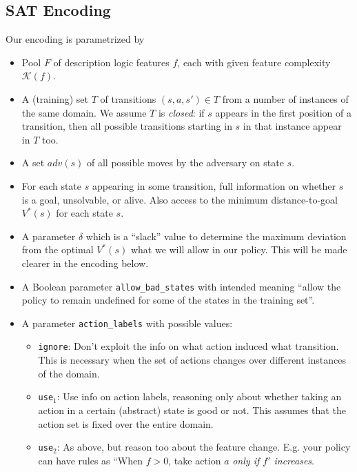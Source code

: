 \documentclass[a4paper]{article}
\begin{document}
\subsection{SAT Encoding}

Our encoding is parametrized by
\begin{itemize}
 \item Pool $F$ of description logic features $f$, each with given feature complexity $\mathcal{K}(f)$.
 \item A (training) set $T$ of transitions $(s, a, s') \in T$ from a number of instances of the same domain.
       We assume $T$ is \emph{closed}: if $s$ appears in the first position of a transition, then all possible
       transitions starting in $s$ in that instance appear in $T$ too.
 \item A set $adv(s)$ of all possible moves by the adversary on state $s$.

 \item For each state $s$ appearing in some transition, full information on whether $s$
       is a goal, unsolvable, or alive.
       Also access to the minimum distance-to-goal $V^*(s)$ for each state $s$.
 \item A parameter $\delta$ which is a ``slack'' value to determine the maximum deviation from the optimal $V^*(s)$
 what we will allow in our policy. This will be made clearer in the encoding below.

 \item A Boolean parameter \texttt{allow\_bad\_states} with intended meaning ``allow the policy
        to remain undefined for some of the states in the training set''.
 \item A parameter \texttt{action\_labels} with possible values:
 \begin{itemize}
   \item \texttt{ignore}: Don't exploit the info on what action induced what transition. This is necessary
  when the set of actions changes over different instances of the domain.
   \item \texttt{use$_1$}: Use info on action labels, reasoning only about whether taking an action in a certain
   (abstract) state is good or not. This assumes that the action set is fixed over the entire domain.
   \item \texttt{use$_2$}: As above, but reason too about the feature change. E.g. your policy can have rules as
  ``When $f>0$, take action $a$ \emph{only if $f'$ increases}.
 \end{itemize}
\end{itemize}
\end{document}
